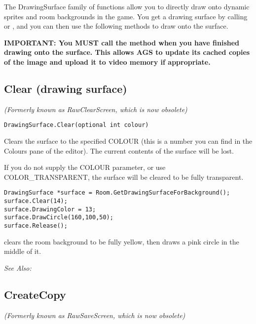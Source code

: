 The DrawingSurface family of functions allow you to directly draw onto dynamic sprites
and room backgrounds in the game. You get a drawing surface by calling
 or
,
and you can then use the following methods to draw onto the surface.

\bf{IMPORTANT:} You \bf{MUST} call the  method
when you have finished drawing onto the surface. This allows AGS to update its cached
copies of the image and upload it to video memory if appropriate.


\subsection{Clear (drawing surface)}\label{DrawingSurface.Clear}%

\it{(Formerly known as RawClearScreen, which is now obsolete)}

\begin{verbatim}
DrawingSurface.Clear(optional int colour)
\end{verbatim}
Clears the surface to the specified COLOUR (this is a number you can find in
the Colours pane of the editor). The current contents of the surface will be lost.

If you do not supply the COLOUR parameter, or use COLOR_TRANSPARENT, the surface
will be cleared to be fully transparent.

\begin{verbatim}
DrawingSurface *surface = Room.GetDrawingSurfaceForBackground();
surface.Clear(14);
surface.DrawingColor = 13;
surface.DrawCircle(160,100,50);
surface.Release();
\end{verbatim}
clears the room background to be fully yellow, then draws a pink circle in the middle of it.

\it{See Also:} 


\subsection{CreateCopy}\label{DrawingSurface.CreateCopy}%

\it{(Formerly known as RawSaveScreen, which is now obsolete)}

